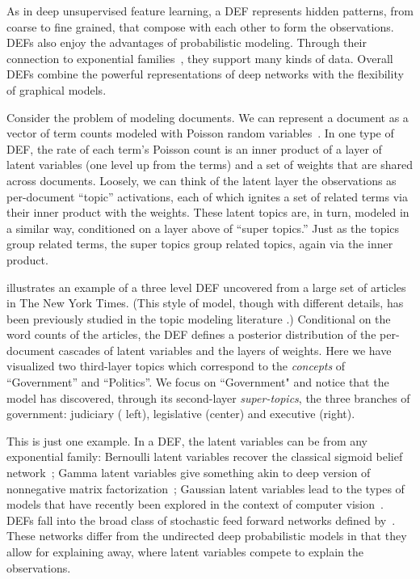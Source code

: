 \documentclass[twoside]{article}
\begin{document}
As in deep unsupervised feature learning, a DEF represents
hidden patterns, from coarse to fine grained, that compose with each other
to form the observations.
DEFs also enjoy the advantages of probabilistic modeling. Through
their connection to exponential families~\cite{Brown:1986}, they
support many kinds of data. 
Overall DEFs combine the powerful representations of deep networks with
the flexibility of graphical models.

Consider the problem of modeling documents. We can
represent a document as a vector of term counts modeled with 
Poisson random variables~\citep{Canny:2004}. In one type of DEF,
the rate of each term's Poisson count is
an inner product of a layer of latent variables (one level up from the
terms) and a set of weights that are shared across documents. Loosely,
we can think of the latent layer the observations as per-document
``topic'' activations, each of
which ignites a set of related terms via their inner product with
the weights. These latent topics are, in turn, modeled in a similar
way, conditioned on a layer above of ``super topics.'' Just as the
topics group related terms, the super topics group related topics,
again via the inner product.

 illustrates an example of a three level DEF uncovered 
from a large set of articles in The New York Times.  (This style of model, though with
different details, has been previously studied in the topic modeling
literature \citep{Li:2006}.)  Conditional on the word counts of the articles, the
DEF defines a posterior distribution of the per-document cascades of
latent variables and the layers of weights.  Here we have visualized
two third-layer topics which correspond to the \emph{concepts} of
``Government'' and ``Politics''. We focus on ``Government" and notice
that the model has discovered, through its second-layer
\emph{super-topics}, the three branches of government: judiciary (
left), legislative (center) and executive (right).

This is just one example.  In a DEF, the latent
variables can be from any exponential family: Bernoulli latent
variables recover the classical sigmoid belief
network~\cite{Neal:1990}; Gamma latent variables give something akin
to deep version of nonnegative matrix factorization~\cite{Lee:1999}; Gaussian latent
variables lead to the types of models that have recently been explored
in the context of computer vision~\cite{Rezende:2014}.  DEFs fall 
into the broad class of stochastic feed forward networks defined
by~\citet{Neal:1990}. These networks differ from the undirected 
deep probabilistic models \citep{Salakhutdinov:2009b,Srivastava:2013} in that they
allow for explaining away, where latent variables compete
to explain the observations. 
\end{document}
